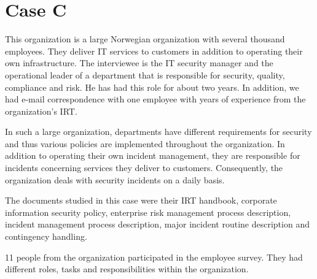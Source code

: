 \section{Case C}
This organization is a large Norwegian organization with several thousand employees. They deliver IT services to customers in addition to operating their own infrastructure. The interviewee is the IT security manager  and the operational leader of a department that is responsible for security, quality, compliance and risk. He has had this role for about two years. In addition, we had e-mail correspondence with one employee with years of experience from the organization's IRT.

In such a large organization, departments have different requirements for security and thus various policies are implemented throughout the organization. In addition to operating their own incident management, they are responsible for incidents concerning services they deliver to customers. Consequently, the organization deals with security incidents on a daily basis. 

The documents studied in this case were their \ac{IRT} handbook, corporate information security policy, enterprise risk management process description, incident management process description, major incident routine description and contingency handling.

11 people from the organization participated in the employee survey. They had different roles, tasks and responsibilities within the organization.